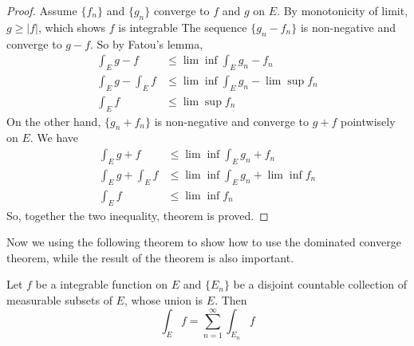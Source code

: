 \documentclass[lang=en, 12pt]{elegantbook}
\begin{document}
        \begin{proof}
            Assume $\{f_n\}$ and $\{g_n\}$ converge to $f$ and $g$ on $E$. By monotonicity of limit, $g \geq |f|$, which shows $f$ is integrable
        The sequence $\{g_n - f_n\}$ is non-negative and converge to  $g-f$. So by Fatou's lemma,
        \begin{equation*}
            \begin{aligned}
                \int_E g-f &\leq \lim \inf \int_E g_n -f_n\\
                \int_E g - \int_E f &\leq \lim \inf \int_E g_n - \lim \sup f_n \\ 
                \int_E f &\leq \lim \sup f_n
            \end{aligned}
        \end{equation*}
        On the other hand, $\{g_n + f_n\}$ is non-negative and converge to $g+f$ pointwisely on $E$. We have 
        \begin{equation*}
            \begin{aligned}
                \int_E g+f &\leq \lim \inf \int_E g_n +f_n\\
                \int_E g + \int_E f &\leq \lim \inf \int_E g_n + \lim \inf f_n \\ 
                \int_E f &\leq \lim \inf f_n
            \end{aligned}
        \end{equation*}
        So, together the two inequality, theorem is proved.
        \end{proof}
        Now we using the following theorem to show how to use the dominated converge theorem, while the result of the theorem is also 
    important.
        \begin{theorem}
            Let $f$ be a integrable function on $E$ and $\{E_n\}$ be a disjoint countable collection of measurable subsets of $E$, whose union is 
        $E$. Then 
        $$\int_E f = \sum_{n=1}^{\infty} \int_{E_n}f$$
        \end{theorem}
\end{document}
